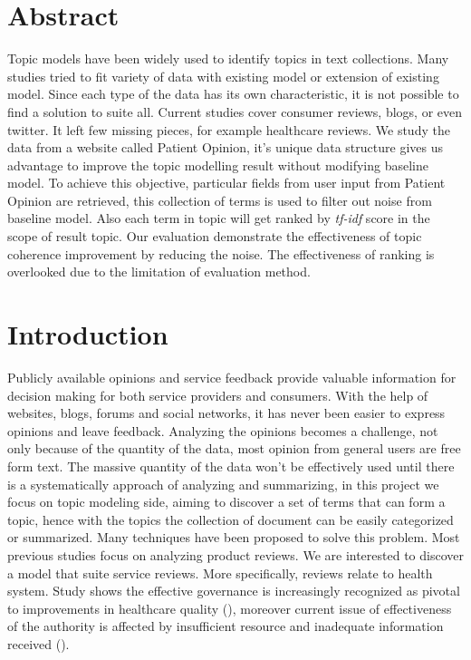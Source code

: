 \documentclass[11pt,twoside]{report}
\begin{document}
\chapter*{Abstract}
Topic models have been widely used to identify topics in text collections. Many studies tried to fit variety of data with existing model or extension of existing model. Since each type of the data has its own characteristic, it is not possible to find a solution to suite all. Current studies cover consumer reviews, blogs, or even twitter. It left few missing pieces, for example healthcare reviews. We study the data from a website called Patient Opinion, it's unique data structure gives us advantage to improve the topic modelling result without modifying baseline model. To achieve this objective, particular fields from user input from Patient Opinion are retrieved, this collection of terms is used to filter out noise from baseline model. Also each term in topic will get ranked by \textit{tf-idf} score in the scope of result topic. Our evaluation demonstrate the effectiveness of topic coherence improvement by reducing the noise. The effectiveness of ranking is overlooked due to the limitation of evaluation method.

\chapter{Introduction}
Publicly available opinions and service feedback provide valuable information for decision making for both service providers and consumers. With the help of websites, blogs, forums and social networks, it has never been easier to express opinions and leave feedback. Analyzing the opinions becomes a challenge, not only because of the quantity of the data, most opinion from general users are free form text. The massive quantity of the data won’t be effectively used until there is a systematically approach of analyzing and summarizing, in this project we focus on topic modeling side, aiming to discover a set of terms that can form a topic, hence with the topics the collection of document can be easily categorized or summarized. Many techniques have been proposed to solve this problem. Most previous studies focus on analyzing product reviews. We are interested to discover a model that suite service reviews. More specifically, reviews relate to health system. Study shows the effective governance is increasingly recognized as pivotal to improvements in healthcare quality (\cite{ref6}), moreover current issue of effectiveness of the authority is affected by insufficient resource and inadequate information received (\cite{ref5}). 
\end{document}

